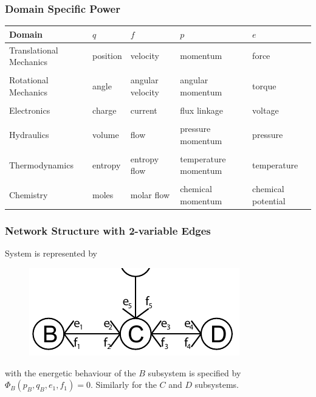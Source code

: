 \documentclass[11pt,reqno]{beamer}
\begin{document}
\begin{frame}
\frametitle{Domain Specific Power}
{\tiny
\begin{tabular}{p{1.5cm} | p{1.75cm} | p{1.75cm} |p{1.75cm} | p{1.75cm}|}
Domain & $q$ & $f$ & $p$ & $e$\\
\hline
Translational Mechanics & position & velocity & momentum & force\\
\hline \\
Rotational Mechanics & angle & angular velocity & angular momentum & torque\\
\hline \\
Electronics & charge  & current & flux linkage & voltage\\
\hline \\
Hydraulics & volume & flow & pressure momentum & pressure\\
\hline \\
Thermodynamics & entropy & entropy flow & temperature momentum & temperature\\
\hline \\
Chemistry & moles & molar flow& chemical momentum & chemical potential\\
\hline 
\end{tabular}}
\end{frame}
\begin{frame}
\frametitle{Network Structure with 2-variable Edges}
System is represented by
\begin{figure}
\includegraphics{images/portbondgraph.pdf}
\end{figure}
with the energetic behaviour of the $B$ subsystem is specified by
$\Phi_B(p_B,q_B,e_1,f_1)= 0$. Similarly for the $C$ and $D$ subsystems.
\end{frame}
\end{document}
